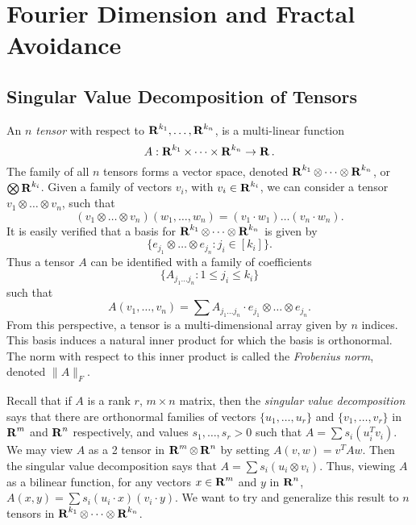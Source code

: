 
\chapter{Fourier Dimension and Fractal Avoidance}
\label{ch:RoughSets}

\section{Singular Value Decomposition of Tensors}

An \emph{$n$ tensor} with respect to $\operatorname{\mathbf{R}}^{k_1}, \dots, \operatorname{\mathbf{R}}^{k_n}$, is a multi-linear function
%
\[ A: \operatorname{\mathbf{R}}^{k_1} \times \dots \times \operatorname{\mathbf{R}}^{k_n} \to \operatorname{\mathbf{R}}. \]
%
The family of all $n$ tensors forms a vector space, denoted $\operatorname{\mathbf{R}}^{k_1} \otimes \dots \otimes \operatorname{\mathbf{R}}^{k_n}$, or $\bigotimes \operatorname{\mathbf{R}}^{k_i}$. Given a family of vectors $v_i$, with $v_i \in \operatorname{\mathbf{R}}^{k_i}$, we can consider a tensor $v_1 \otimes \dots \otimes v_n$, such that
%
\[ (v_1 \otimes \dots \otimes v_n)(w_1, \dots, w_n) = (v_1 \cdot w_1) \dots (v_n \cdot w_n). \]
%
It is easily verified that a basis for $\operatorname{\mathbf{R}}^{k_1} \otimes \dots \otimes \operatorname{\mathbf{R}}^{k_n}$ is given by
%
\[ \{ e_{j_1} \otimes \dots \otimes e_{j_n} : j_i \in [k_i] \}. \]
%
Thus a tensor $A$ can be identified with a family of coefficients
%
\[ \{ A_{j_1 \dots j_n} : 1 \leq j_i \leq k_i \} \]
%
such that
%
\[ A(v_1,\dots,v_n) = \sum A_{j_1 \dots j_n} \cdot e_{j_1} \otimes \dots \otimes e_{j_n}. \]
%
From this perspective, a tensor is a multi-dimensional array given by $n$ indices. This basis induces a natural inner product for which the basis is orthonormal. The norm with respect to this inner product is called the \emph{Frobenius norm}, denoted $\| A \|_F$.

Recall that if $A$ is a rank $r$, $m \times n$ matrix, then the \emph{singular value decomposition} says that there are orthonormal families of vectors $\{ u_1, \dots, u_r \}$ and $\{ v_1, \dots, v_r \}$ in $\operatorname{\mathbf{R}}^m$ and $\operatorname{\mathbf{R}}^n$ respectively, and values $s_1, \dots, s_r > 0$ such that $A = \sum s_i (u_i^T v_i)$. We may view $A$ as a 2 tensor in $\operatorname{\mathbf{R}}^m \otimes \operatorname{\mathbf{R}}^n$ by setting $A(v,w) = v^T A w$. Then the singular value decomposition says that $A = \sum s_i (u_i \otimes v_i)$. Thus, viewing $A$ as a bilinear function, for any vectors $x \in \operatorname{\mathbf{R}}^m$ and $y$ in $\operatorname{\mathbf{R}}^n$, $A(x,y) = \sum s_i (u_i \cdot x) (v_i \cdot y)$. We want to try and generalize this result to $n$ tensors in $\operatorname{\mathbf{R}}^{k_1} \otimes \dots \otimes \operatorname{\mathbf{R}}^{k_n}$.

